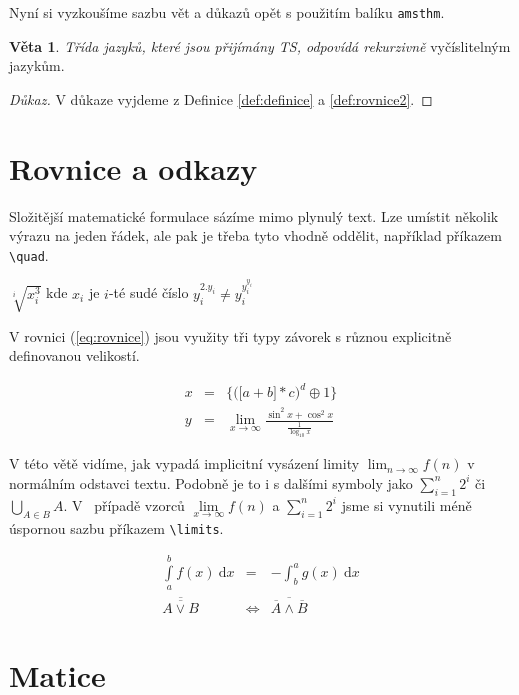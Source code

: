 \documentclass[11pt, a4paper, twocolumn]{article}
\theoremstyle{definition}
\newtheorem{sentence}{Věta}
\begin{document}
Nyní si vyzkoušíme sazbu vět a důkazů opět s použitím balíku \verb|amsthm|.

\begin{sentence}
\emph{Třída jazyků, které jsou přijímány TS, odpovídá
rekurzivně} vyčíslitelným jazykům.
\end{sentence}

\begin{proof}[Důkaz]
V důkaze vyjdeme z Definice \ref{def:definice} a \ref{def:rovnice2}.
\end{proof}

\section{Rovnice a odkazy}
Složitější matematické formulace sázíme mimo plynulý
text. Lze umístit několik výrazu na jeden řádek, ale pak je
třeba tyto vhodně oddělit, například příkazem \verb|\quad|. \par

\begin{center}
$\sqrt[i]{x_i^3}$ kde $x_i$ je $i$-té sudé číslo $y_i^{2.y_i} \neq y_i^{y_i^{y_i}}$
\end{center}

V rovnici (\ref{eq:rovnice}) jsou využity tři typy závorek s různou
explicitně definovanou velikostí.

\begin{eqnarray} \label{eq:rovnice}
x &=& \bigg\lbrace \Big( \big[ a+b \big] * c \Big)^d \oplus 1 \bigg\rbrace \\
y &=& \lim_{x\to\infty} \frac{\sin^2x + \cos^2x}{\frac{1}{\log_{10} x}}\nonumber
\end{eqnarray}

V této větě vidíme, jak vypadá implicitní vysázení limity $\lim_{n\to\infty} f(n)$ v normálním odstavci textu. Podobně je to i s dalšími  symboly jako $\sum_{i=1}^{n} 2^i$ či $\bigcup_{A\in B}A$. V~ případě
vzorců $\lim\limits_{x\to\infty} f(n)$ a $\sum\limits_{i=1}^n 2^i$ jsme si vynutili méně úspornou sazbu příkazem \verb|\limits|.

\begin{eqnarray}
\int\limits_{a}^{b}f(x) \ \mathrm{d}x &=& - \int_{b}^{a}g(x)\  \mathrm{d}x \\
\overline{\overline{A \vee B}} &\Leftrightarrow & \overline{\overline{A}\wedge \overline{B}}
\end{eqnarray}

\section{Matice}
\end{document}
